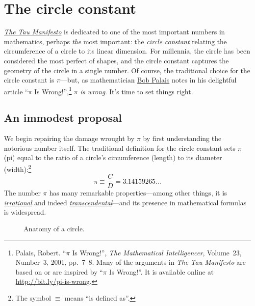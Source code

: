 \section{The circle constant} %
\label{sec:the_circle_constant}

\href{http://tauday.com/tau-manifesto}{\emph{The Tau Manifesto}} is dedicated to one of the most important numbers in mathematics, perhaps \emph{the} most important: the \emph{circle constant} relating the circumference of a circle to its linear dimension. For millennia, the circle has been considered the most perfect of shapes, and the circle constant captures the geometry of the circle in a single number. Of course, the traditional choice for the circle constant is $\pi$---but, as mathematician \href{http://www.math.utah.edu/~palais}{Bob Palais} notes in his delightful article ``$\pi$ Is Wrong!'',\footnote{Palais, Robert. ``$\pi$ Is Wrong!'', \emph{The Mathematical Intelligencer}, Volume~23, Number~3, 2001, pp.~7--8. Many of the arguments in \emph{The Tau Manifesto} are based on or are inspired by ``$\pi$ Is Wrong!''. It is available online at \href{http://www.math.utah.edu/~palais/pi.html}{http://bit.ly/pi-is-wrong}.} $\pi$ \emph{is wrong}. It's time to set things right.

  \subsection{An immodest proposal} %
  \label{sec:an_immodest_proposal}

We begin repairing the damage wrought by $\pi$ by first understanding the notorious number itself. The traditional definition for the circle constant sets $\pi$ (pi) equal to the ratio of a circle's circumference (length) to its diameter (width):\footnote{The symbol $\equiv$ means ``is defined as''.}
\begin{equation}
\label{eq:pi}
\pi \equiv \frac{C}{D} = 3.14159265\ldots
\end{equation}
The number $\pi$ has many remarkable properties---among other things, it is \href{https://en.wikipedia.org/wiki/Irrational_number}{\emph{irrational}} and indeed \href{https://en.wikipedia.org/wiki/Transcendental_number}{\emph{transcendental}}---and its presence in mathematical formulas is widespread.

\begin{figure}
\caption{Anatomy of a circle.\label{fig:circle}}
\end{figure}

